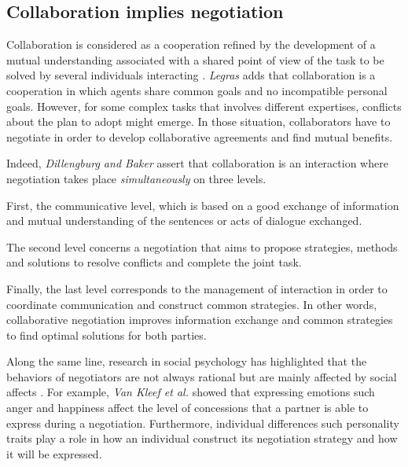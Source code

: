 \documentclass[10pt, a4paper]{article} %
\begin{document}
\subsection{Collaboration implies negotiation}

	
	Collaboration is considered as a cooperation refined by the development of a mutual understanding associated with a shared point of view of the task to be solved by several individuals interacting \cite{weiss1999multiagent,blanquet2007web}. \emph{Legras} \cites{legrascooperation} adds that collaboration is a cooperation in which agents share  common goals and no incompatible personal goals. 
	However, for some complex tasks that involves different expertises, conflicts about the plan to adopt might emerge. In those situation, collaborators have to negotiate in order to develop collaborative agreements and find mutual benefits.
		
	Indeed, \emph{Dillengburg and Baker} \cite{dillenbourg1996negotiation} assert that collaboration is an interaction where negotiation takes place \textit{simultaneously} on three levels. 
	
	First, the communicative level, which is based on a good exchange of information and mutual understanding of the sentences or acts of dialogue exchanged. 
	
	The second level concerns a negotiation that aims to propose strategies, methods and solutions to resolve conflicts and complete the joint task. 
	
	Finally, the last level corresponds to the management of interaction in order to coordinate communication and construct common strategies. In other words, collaborative negotiation improves information exchange and common strategies to find optimal solutions for both parties. 
 
	 Along the same line, research in social psychology has highlighted that the behaviors of negotiators are not always rational but are mainly affected by social affects \cite{thompson2010negotiation}. For example, \emph{Van Kleef et al.} \cite{van2006power} showed that expressing emotions such anger and happiness affect the level of concessions that a partner is able to express during a negotiation. Furthermore, individual differences such personality traits \cite{sharma2013role} play a role in how an individual construct its negotiation strategy and how it will be expressed. 
	 	
\end{document}
